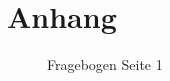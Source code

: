 
\appendix
\chapter{Anhang}


\begin{figure}
    \label{frabo1}
    \caption{Fragebogen Seite 1}
    \centering
\end{figure}

